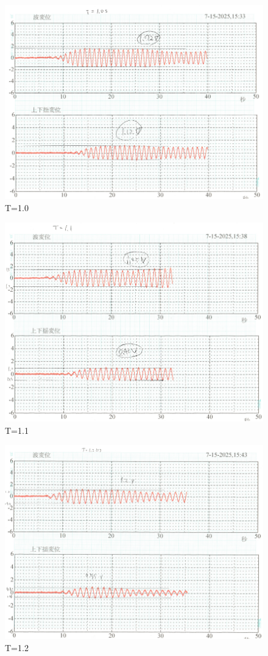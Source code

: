 \documentclass[dvipdfmx,a4paper]{jreport} %
\begin{document}
\begin{figure}[H]
    \centering
    \includegraphics[width=0.9\linewidth]{summer/ship-experiment/2d-pool/pictures/t1.0.png}
    \caption{T=1.0}
    \label{fig:t1.0}
\end{figure}
\begin{figure}[H]
    \centering
    \includegraphics[width=0.9\linewidth]{summer/ship-experiment/2d-pool/pictures/t1.1.png}
    \caption{T=1.1}
    \label{fig:t1.1}
\end{figure}
\begin{figure}[H]
    \centering
    \includegraphics[width=0.9\linewidth]{summer/ship-experiment/2d-pool/pictures/t1.2.png}
    \caption{T=1.2}
    \label{fig:t1.2}
\end{figure}
\end{document}
